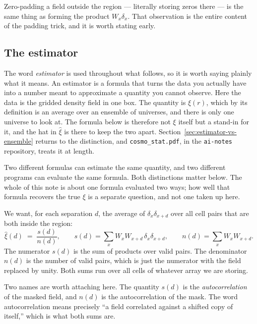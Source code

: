 \documentclass[12pt]{article}
\newcommand{\code}[1]{\texttt{#1}}
\newcommand{\W}{W}
\begin{document}
Zero-padding a field outside the region --- literally storing zeros there ---
is the same thing as forming the product $\W_x \delta_x$.  That observation is
the entire content of the padding trick, and it is worth stating early.

\subsection{The estimator}

The word \emph{estimator} is used throughout what follows, so it is worth
saying plainly what it means.  An estimator is a formula that turns the data
you actually have into a number meant to approximate a quantity you cannot
observe.  Here the data is the gridded density field in one box.  The
quantity is $\xi(r)$, which by its definition is an average over an ensemble
of universes, and there is only one universe to look at.  The formula below
is therefore not $\xi$ itself but a stand-in for it, and the hat in
$\hat\xi$ is there to keep the two apart.  Section~\ref{sec:estimator-vs-ensemble}
returns to the distinction, and \code{cosmo\_stat.pdf}, in the
\code{ai-notes} repository, treats it at length.

Two different formulas can estimate the same quantity, and two different
programs can evaluate the same formula.  Both distinctions matter below.  The
whole of this note is about one formula evaluated two ways; how well that
formula recovers the true $\xi$ is a separate question, and not one taken up
here.

We want, for each separation $d$, the average of $\delta_x \delta_{x+d}$ over
all cell pairs that are both inside the region:
\begin{equation}\label{eq:estimator}
  \hat\xi(d) \;=\; \frac{s(d)}{n(d)},
  \qquad
  s(d) = \sum_x \W_x \W_{x+d}\, \delta_x \delta_{x+d},
  \qquad
  n(d) = \sum_x \W_x \W_{x+d} .
\end{equation}
The numerator $s(d)$ is the sum of products over valid pairs.  The denominator
$n(d)$ is the number of valid pairs, which is just the numerator with the
field replaced by unity.  Both sums run over all cells of whatever array we
are storing.

Two names are worth attaching here.  The quantity $s(d)$ is the
\emph{autocorrelation} of the masked field, and $n(d)$ is the
autocorrelation of the mask.  The word autocorrelation means precisely ``a
field correlated against a shifted copy of itself,'' which is what both sums
are.
\end{document}
